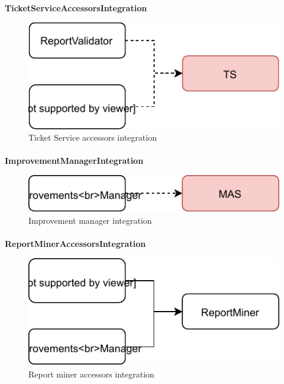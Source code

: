 			\paragraph{}
				\textbf{TicketServiceAccessorsIntegration}
					\begin{figure}
						\centering
						\includegraphics[width=\textwidth]{images/Integration/TicketServiceAccessorsIntegration.pdf}
						\caption{Ticket Service accessors integration}
					\end{figure}
			\paragraph{}
				\textbf{ImprovementManagerIntegration}
					\begin{figure}
						\centering
						\includegraphics[width=\textwidth]{images/Integration/ImprovementManagerIntegration.pdf}
						\caption{Improvement manager integration}
					\end{figure}
			\paragraph{}
				\textbf{ReportMinerAccessorsIntegration}
					\begin{figure}
						\centering
						\includegraphics[width=\textwidth]{images/Integration/ReportMinerAccessorsIntegration.pdf}
						\caption{Report miner accessors integration}
					\end{figure}
